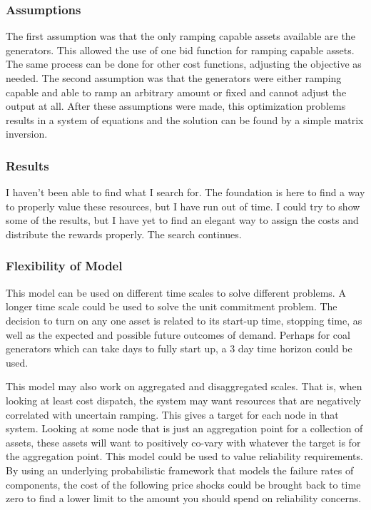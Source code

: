 \subsubsection{Assumptions}
The first assumption was that the only ramping capable assets available are the generators.  This allowed the use of one bid function for ramping capable assets.  The same process can be done for other cost functions, adjusting the objective as needed.  The second assumption was that the generators were either ramping capable and able to ramp an arbitrary amount or fixed and cannot adjust the output at all.  After these assumptions were made, this optimization problems results in a system of equations and the solution can be found by a simple matrix inversion.

\subsubsection{Results}
I haven’t been able to find what I search for.  The foundation is here to find a way to properly value these resources, but I have run out of time.  I could try to show some of the results, but I have yet to find an elegant way to assign the costs and distribute the rewards properly.  The search continues. 

\subsubsection{Flexibility of Model}
This model can be used on different time scales to solve different problems.  A longer time scale could be used to solve the unit commitment problem.  The decision to turn on any one asset is related to its start-up time, stopping time, as well as the expected and possible future outcomes of demand.  Perhaps for coal generators which can take days to fully start up, a 3 day time horizon could be used.

This model may also work on aggregated and disaggregated scales.  That is, when looking at least cost dispatch, the system may want resources that are negatively correlated with uncertain ramping.  This gives a target for each node in that system.  Looking at some node that is just an aggregation point for a collection of assets, these assets will want to positively co-vary with whatever the target is for the aggregation point.
This model could be used to value reliability requirements.  By using an underlying probabilistic framework that models the failure rates of components, the cost of the following price shocks could be brought back to time zero to find a lower limit to the amount you should spend on reliability concerns.

